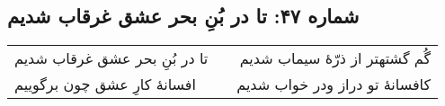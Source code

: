 \begin{center}
\section*{شماره ۴۷: تا در بُنِ بحر عشق غرقاب شدیم}
\label{sec:047}
\begin{longtable}{l p{0.5cm} r}
تا در بُنِ بحر عشق غرقاب شدیم
&&
گُم گشتهتر از ذرّهٔ سیماب شدیم
\\
افسانهٔ کارِ عشق چون برگوییم
&&
کافسانهٔ تو دراز ودر خواب شدیم
\\
\end{longtable}
\end{center}

